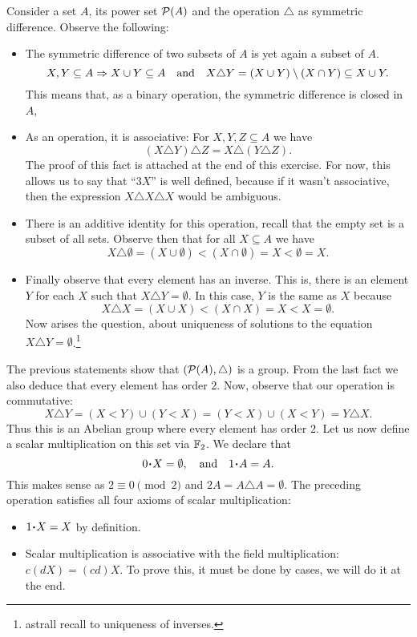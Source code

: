 \documentclass[12pt]{memoir}
\begin{document}
\begin{ptcbr}
Consider a set $A$, its power set $\mathcal{P}(A)$ and the operation $\triangle$ as symmetric difference. Observe the following:
\begin{itemize}
    \item The symmetric difference of two subsets of $A$ is yet again a subset of $A$.
    $$X,Y\subseteq A\Rightarrow X\cup Y\subseteq A\quad\text{and}\quad X\triangle Y=(X\cup Y)\setminus(X\cap Y)\subseteq X\cup Y.$$
    This means that, as a binary operation, the symmetric difference is closed in $A$,
    \item As an operation, it is associative: For $X,Y,Z\subseteq A$ we have
    $$(X\triangle Y)\triangle Z=X\triangle(Y\triangle Z).$$
    The proof of this fact is attached at the end of this exercise. For now, this allows us to say that ``$3X$'' is well defined, because if it wasn't associative, then the expression $X\triangle X\triangle X$ would be ambiguous.
    \item There is an additive identity for this operation, recall that the empty set is a subset of all sets. Observe then that for all $X\subseteq A$ we have
    $$X\triangle \emptyset= (X\cup \emptyset)\less(X\cap \emptyset)=X\less \emptyset=X.$$
    \item Finally observe that every element has an inverse. This is, there is an element $Y$ for each $X$ such that $X\triangle Y=\emptyset$. In this case, $Y$ is the same as $X$ because 
    $$X\triangle X=(X\cup X)\less(X\cap X)=X\less X=\emptyset.$$
    Now arises the question, about uniqueness of solutions to the equation $X\triangle Y=\emptyset$.\footnote{astrall recall to uniqueness of inverses.}
\end{itemize}
The previous statements show that $(\mathcal{P}(A),\triangle)$ is a group. From the last fact we also deduce that every element has order $2$. Now, observe that our operation is commutative:
$$X\triangle Y=(X\less Y)\cup (Y\less X)=(Y\less X)\cup(X\less Y)=Y\triangle X.$$
Thus this is an Abelian group where every element has order $2$. Let us now define a scalar multiplication on this set via $\mathbb{F}_2$. We declare that 
$$0\.X=\emptyset,\word{and}1\.A=A.$$
This makes sense as $2\equiv 0\pmod 2$ and $2A=A\triangle A=\emptyset$. The preceding operation satisfies all four axioms of scalar multiplication:
\begin{itemize}
    \item $1\.X=X$ by definition.
    \item Scalar multiplication is associative with the field multiplication: $c(dX)=(cd)X$. To prove this, it must be done by cases, we will do it at the end.

\end{itemize}
\end{ptcbr}
\end{document}
